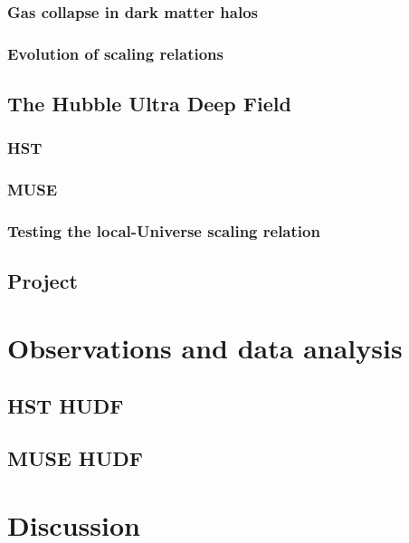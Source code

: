 \documentclass[12pt, twocolumn]{revtex4}    %
\begin{document}
\subsubsection{Gas collapse in dark matter halos}

\subsubsection{Evolution of scaling relations}

\subsection{The Hubble Ultra Deep Field}

\subsubsection{HST}

\subsubsection{MUSE}

\subsubsection{Testing the local-Universe scaling relation}

\subsection{Project} %

\section{Observations and data analysis}

\subsection{HST HUDF}

\subsection{MUSE HUDF}

\section{Discussion}
\end{document}
